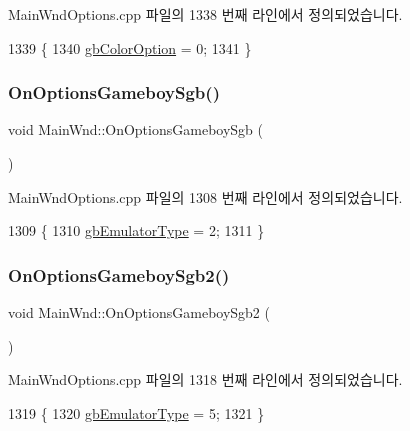 Main\+Wnd\+Options.\+cpp 파일의 1338 번째 라인에서 정의되었습니다.


\begin{DoxyCode}
1339 \{
1340   \mbox{\hyperlink{gb_globals_8cpp_abb08650d8f653865820da10dc8e59a8b}{gbColorOption}} = 0;  
1341 \}
\end{DoxyCode}
\mbox{\label{class_main_wnd_a8a68d6c4577e01b29a29860266c7ed07}} 
\subsubsection{\texorpdfstring{On\+Options\+Gameboy\+Sgb()}{OnOptionsGameboySgb()}}
{\footnotesize\ttfamily void Main\+Wnd\+::\+On\+Options\+Gameboy\+Sgb (\begin{DoxyParamCaption}{ }\end{DoxyParamCaption})\hspace{0.3cm}{\ttfamily [protected]}}



Main\+Wnd\+Options.\+cpp 파일의 1308 번째 라인에서 정의되었습니다.


\begin{DoxyCode}
1309 \{
1310   \mbox{\hyperlink{gb_globals_8cpp_aab449ed6ecf2bd502928a3d5aa5c54c4}{gbEmulatorType}} = 2;  
1311 \}
\end{DoxyCode}
\mbox{\label{class_main_wnd_aabb11ee170b5116fb889995f168e6045}} 
\subsubsection{\texorpdfstring{On\+Options\+Gameboy\+Sgb2()}{OnOptionsGameboySgb2()}}
{\footnotesize\ttfamily void Main\+Wnd\+::\+On\+Options\+Gameboy\+Sgb2 (\begin{DoxyParamCaption}{ }\end{DoxyParamCaption})\hspace{0.3cm}{\ttfamily [protected]}}



Main\+Wnd\+Options.\+cpp 파일의 1318 번째 라인에서 정의되었습니다.


\begin{DoxyCode}
1319 \{
1320   \mbox{\hyperlink{gb_globals_8cpp_aab449ed6ecf2bd502928a3d5aa5c54c4}{gbEmulatorType}} = 5;  
1321 \}
\end{DoxyCode}
\mbox{\label{class_main_wnd_a2b3ef3e8d807f8399870b6a898fbd4e3}} 
